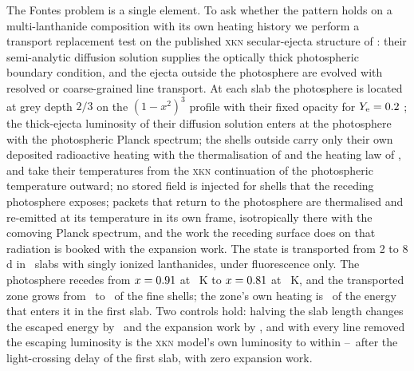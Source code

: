 \documentclass[fleqn,usenatbib]{mnras}
\begin{document}
The Fontes problem is a single element. To ask whether the pattern holds on a multi-lanthanide composition with its own heating history we perform a transport replacement test on the published \textsc{xkn} secular-ejecta structure of \citet{ricigliano2024}: their semi-analytic diffusion solution supplies the optically thick photospheric boundary condition, and the ejecta outside the photosphere are evolved with resolved or coarse-grained line transport. At each slab the photosphere is located at grey depth $2/3$ on the $(1-x^2)^3$ profile with their fixed opacity for $Y_{\rm e}=0.2$ \citep{tanaka2020}; the thick-ejecta luminosity of their diffusion solution enters at the photosphere with the photospheric Planck spectrum; the shells outside carry only their own deposited radioactive heating with the thermalisation of \citet{barnes2016} and the heating law of \citet{korobkin2012}, and take their temperatures from the \textsc{xkn} continuation of the photospheric temperature outward; no stored field is injected for shells that the receding photosphere exposes; packets that return to the photosphere are thermalised and re-emitted at its temperature in its own frame, isotropically there with the comoving Planck spectrum, and the work the receding surface does on that radiation is booked with the expansion work. The state is transported from 2 to 8 d in \PxSlabs\ slabs with singly ionized lanthanides, under fluorescence only. The photosphere recedes from $x=0.91$ at \PxTphFirst\ K to $x=0.81$ at \PxTphLast\ K, and the transported zone grows from \PxZoneFirst\ to \PxZoneLast\ of the fine shells; the zone's own heating is \PxHeatFrac\ of the energy that enters it in the first slab. Two controls hold: halving the slab length changes the escaped energy by \PxConvErad\ and the expansion work by \PxConvW, and with every line removed the escaping luminosity is the \textsc{xkn} model's own luminosity to within \PxFreeRatioMin--\PxFreeRatioMax\ after the light-crossing delay of the first slab, with zero expansion work.  %
\end{document}
